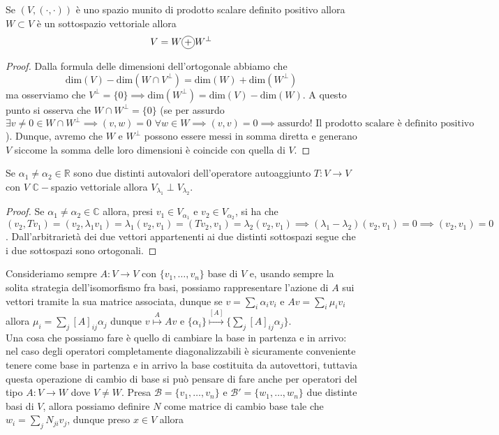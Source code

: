 \documentclass[12pt, twoside, italian, openany]{book}
\begin{document}
	\begin{prop}
		Se $(V, (\cdot, \cdot))$ è uno spazio munito di prodotto scalare definito positivo allora $W \subset V$ è un sottospazio vettoriale allora
		$$
			V = W \circled{+} W^\perp
		$$
	\end{prop}
	\begin{proof}
		Dalla formula delle dimensioni dell'ortogonale abbiamo che
		$$
		\text{dim}(V) - \text{dim}(W \cap V^\perp) = \text{dim}(W) + \text{dim}(W^{\perp})
		$$
		ma osserviamo che $V^\perp = \{ 0 \} \implies \text{dim}(W^\perp) = \text{dim}(V) - \text{dim}(W)$. A questo punto si osserva che $W \cap W^{\perp} = \{ 0 \}$ (se per assurdo $\exists v \neq 0 \in W \cap W^{\perp} \implies (v, w) = 0 \, \, \forall w \in W \implies (v, v) = 0 \implies \text{assurdo! Il prodotto scalare è definito positivo}$). Dunque, avremo che $W$ e $W^{\perp}$ possono essere messi in somma diretta e generano $V$ siccome la somma delle loro dimensioni è coincide con quella di $V$.
	\end{proof}
	\begin{prop}
		Se $\alpha_1 \neq \alpha_2 \in \mathbb{R}$ sono due distinti autovalori dell'operatore autoaggiunto $T:V \to V$ con $V$ $\mathbb{C}-$spazio vettoriale allora $V_{\lambda_1} \perp V_{\lambda_2}$.
	\end{prop}
	\begin{proof}
		Se $\alpha_1 \neq \alpha_2 \in \mathbb{C}$ allora, presi $v_1 \in V_{\alpha_1}$ e $v_2 \in V_{\alpha_2}$, si ha che $(v_2, Tv_1) = (v_2, \lambda_1 v_1) = \lambda_1 (v_2, v_1) = (Tv_2, v_1) = \lambda_2 (v_2, v_1) \implies (\lambda_1 - \lambda_2) (v_2, v_1) = 0 \implies (v_2, v_1) = 0$. Dall'arbitrarietà dei due vettori appartenenti ai due distinti sottospazi segue che i due sottospazi sono ortogonali.
	\end{proof}
	Consideriamo sempre $A: V \to V$ con $\{ v_1, \ldots, v_n \}$ base di $V$ e, usando sempre la solita strategia dell'isomorfismo fra basi, possiamo rappresentare l'azione di  $A$ sui vettori tramite la sua matrice associata, dunque se $v = \sum\limits_i \alpha_i v_i$ e $Av = \sum\limits_i \mu_i v_i$ allora $\mu_i = \sum\limits_j [A]_{ij} \alpha_j$ dunque $v \stackrel{A}{\mapsto} Av$ e $\{ \alpha_i \} \stackrel{[A]}{\mapsto} \{ \sum\limits_j [A]_{ij} \alpha_j \}$. 	\\
	Una cosa che possiamo fare è quello di cambiare la base in partenza e in arrivo: nel caso degli operatori completamente diagonalizzabili è sicuramente conveniente tenere come base in partenza e in arrivo la base costituita da autovettori, tuttavia questa operazione di cambio di base si può pensare di fare anche per operatori del tipo $A: V \to W$ dove $V \neq W$. Presa $\mathcal{B} = \{ v_1, \ldots, v_n \}$ e $\mathcal{B}' = \{ w_1, \ldots, w_n \}$ due distinte basi di $V$, allora possiamo definire $N$ come matrice di cambio base tale che $w_i = \sum\limits_j N_{ji} v_j$, dunque preso $x \in V$ allora
\end{document}
